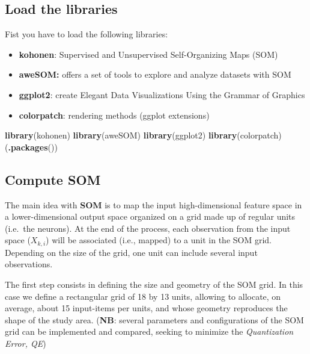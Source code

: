 \documentclass[
]{book}
\newenvironment{Shaded}{\begin{snugshade}}{\end{snugshade}}
\newcommand{\FunctionTok}[1]{\textcolor[rgb]{0.13,0.29,0.53}{\textbf{#1}}}
\newcommand{\NormalTok}[1]{#1}
\begin{document}
\hypertarget{load-the-libraries-3}{%
\subsection{Load the libraries}\label{load-the-libraries-3}}

Fist you have to load the following libraries:

\begin{itemize}
\item
  \textbf{kohonen}: Supervised and Unsupervised Self-Organizing Maps (SOM)
\item
  \textbf{aweSOM:} offers a set of tools to explore and analyze datasets with SOM
\item
  \textbf{ggplot2}: create Elegant Data Visualizations Using the Grammar of Graphics
\item
  \textbf{colorpatch}: rendering methods (ggplot extensions)
\end{itemize}

\begin{Shaded}
\begin{Highlighting}[]
\FunctionTok{library}\NormalTok{(kohonen)}
\FunctionTok{library}\NormalTok{(aweSOM)}
\FunctionTok{library}\NormalTok{(ggplot2)}
\FunctionTok{library}\NormalTok{(colorpatch)}
\NormalTok{(}\FunctionTok{.packages}\NormalTok{())}
\end{Highlighting}
\end{Shaded}

\hypertarget{compute-som}{%
\subsection{Compute SOM}\label{compute-som}}

The main idea with \textbf{SOM} is to map the input high-dimensional feature space in a lower-dimensional output space organized on a grid made up of regular units (i.e.~the neurons).
At the end of the process, each observation from the input space (\(X_{k,i}\)) will be associated (i.e., mapped) to a unit in the SOM grid.
Depending on the size of the grid, one unit can include several input observations.

The first step consists in defining the size and geometry of the SOM grid.
In this case we define a rectangular grid of 18 by 13 units, allowing to allocate, on average, about 15 input-items per units, and whose geometry reproduces the shape of the study area.
(\textbf{NB}: several parameters and configurations of the SOM grid can be implemented and compared, seeking to minimize the \emph{Quantization Error, QE})
\end{document}
